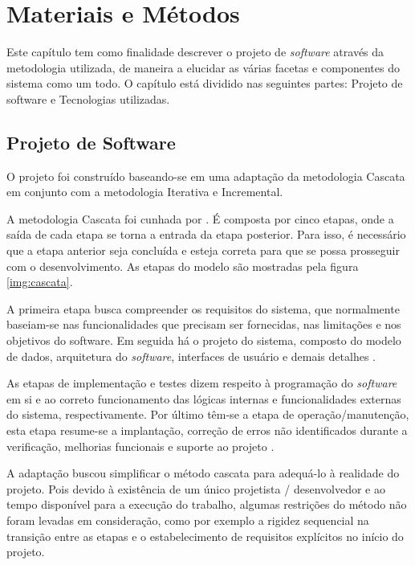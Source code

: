 \chapter{Materiais e Métodos} \label{ch:MM}

Este capítulo tem como finalidade descrever o projeto de \textit{software} através da metodologia utilizada, de maneira a elucidar as várias facetas e componentes do sistema como um todo. O capítulo está dividido nas seguintes partes: Projeto de software e Tecnologias utilizadas.

\section{Projeto de Software} 

O projeto foi construído baseando-se em uma adaptação da metodologia Cascata em conjunto com a metodologia Iterativa e Incremental.

A metodologia Cascata foi cunhada por . É composta por cinco etapas, onde a saída de cada etapa se torna a entrada da etapa posterior. Para isso, é necessário que a etapa anterior seja concluída e esteja correta para que se possa prosseguir com o desenvolvimento. As etapas do modelo são mostradas pela figura \ref{img:cascata}.


A primeira etapa busca compreender os requisitos do sistema, que normalmente baseiam-se nas funcionalidades que precisam ser fornecidas, nas limitações e nos objetivos do software. Em seguida há o projeto do sistema, composto do modelo de dados, arquitetura do \textit{software}, interfaces de usuário e demais detalhes \cite{SITECASCATA1, SITECASCATA2}.

As etapas de implementação e testes dizem respeito à programação do \textit{software} em si e ao correto funcionamento das lógicas internas e funcionalidades externas do sistema, respectivamente. Por último têm-se a etapa de operação/manutenção, esta etapa resume-se a implantação, correção de erros não identificados durante a verificação, melhorias funcionais e suporte ao projeto \cite{SITECASCATA1, SITECASCATA2}.

A adaptação buscou simplificar o método cascata para adequá-lo à realidade do projeto. Pois devido à existência de um único projetista / desenvolvedor e ao tempo disponível para a execução do trabalho, algumas restrições do método não foram levadas em consideração, como por exemplo a rigidez sequencial na transição entre as etapas e o estabelecimento de requisitos explícitos no início do projeto.

